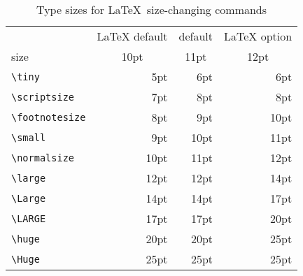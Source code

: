 \begin{table}
\centering
\caption{Type sizes for \LaTeX\ size-changing commands}
\label{tab:styles}
\vspace{\baselineskip}
\begin{tabular}{l|r|r|r|}
\multicolumn{1}{l}{} &
         \multicolumn{1}{c}{\LaTeX{} default} &
         \multicolumn{1}{c}{\uicthesi{} default} &
         \multicolumn{1}{c}{\LaTeX{} option} \\
\multicolumn{1}{l}{size} &
        \multicolumn{1}{c}{10pt} &
        \multicolumn{1}{c}{11pt}  &
        \multicolumn{1}{c}{12pt}\\
\cline{2-4}
\verb|\tiny|       & 5pt  & 6pt & 6pt\\
\cline{2-4}
\verb|\scriptsize| & 7pt  & 8pt & 8pt\\
\cline{2-4}
\verb|\footnotesize| & 8pt & 9pt & 10pt \\
\cline{2-4}
\verb|\small|        & 9pt & 10pt & 11pt \\
\cline{2-4}
\verb|\normalsize| & 10pt & 11pt & 12pt \\
\cline{2-4}
\verb|\large|      & 12pt & 12pt & 14pt \\
\cline{2-4}
\verb|\Large|      & 14pt & 14pt & 17pt \\
\cline{2-4}
\verb|\LARGE|      & 17pt & 17pt & 20pt\\
\cline{2-4}
\verb|\huge|       & 20pt & 20pt & 25pt\\
\cline{2-4}
\verb|\Huge|       & 25pt & 25pt & 25pt\\
\cline{2-4}
\end{tabular}
\vspace{\baselineskip}
\end{table}
 
